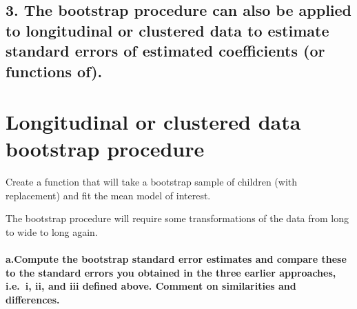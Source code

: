 \documentclass[
]{article}
\begin{document}
\hypertarget{the-bootstrap-procedure-can-also-be-applied-to-longitudinal-or-clustered-data-to-estimate-standard-errors-of-estimated-coefficients-or-functions-of.}{%
\subsection{3. The bootstrap procedure can also be applied to
longitudinal or clustered data to estimate standard errors of estimated
coefficients (or functions
of).}\label{the-bootstrap-procedure-can-also-be-applied-to-longitudinal-or-clustered-data-to-estimate-standard-errors-of-estimated-coefficients-or-functions-of.}}

\hypertarget{longitudinal-or-clustered-data-bootstrap-procedure}{%
\section{Longitudinal or clustered data bootstrap
procedure}\label{longitudinal-or-clustered-data-bootstrap-procedure}}

Create a function that will take a bootstrap sample of children (with
replacement) and fit the mean model of interest.

The bootstrap procedure will require some transformations of the data
from long to wide to long again.

\hypertarget{a.compute-the-bootstrap-standard-error-estimates-and-compare-these-to-the-standard-errors-you-obtained-in-the-three-earlier-approaches-i.e.-i-ii-and-iii-defined-above.-comment-on-similarities-and-differences.}{%
\paragraph{a.Compute the bootstrap standard error estimates and compare
these to the standard errors you obtained in the three earlier
approaches, i.e.~i, ii, and iii defined above. Comment on similarities
and
differences.}\label{a.compute-the-bootstrap-standard-error-estimates-and-compare-these-to-the-standard-errors-you-obtained-in-the-three-earlier-approaches-i.e.-i-ii-and-iii-defined-above.-comment-on-similarities-and-differences.}}
\end{document}
